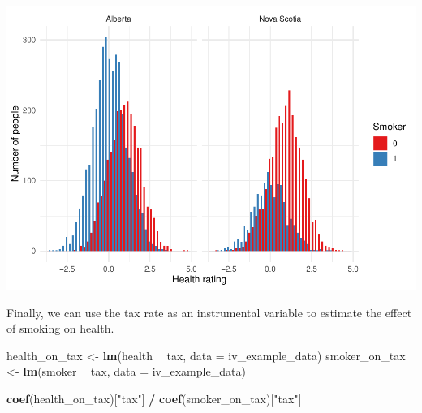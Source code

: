 \documentclass[
]{book}
\newenvironment{Shaded}{\begin{snugshade}}{\end{snugshade}}
\newcommand{\DataTypeTok}[1]{\textcolor[rgb]{0.13,0.29,0.53}{#1}}
\newcommand{\FloatTok}[1]{\textcolor[rgb]{0.00,0.00,0.81}{#1}}
\newcommand{\KeywordTok}[1]{\textcolor[rgb]{0.13,0.29,0.53}{\textbf{#1}}}
\newcommand{\NormalTok}[1]{#1}
\newcommand{\OperatorTok}[1]{\textcolor[rgb]{0.81,0.36,0.00}{\textbf{#1}}}
\newcommand{\StringTok}[1]{\textcolor[rgb]{0.31,0.60,0.02}{#1}}
\begin{document}
\begin{Shaded}
\end{Shaded}

\includegraphics{telling_stories_with_data_files/figure-latex/unnamed-chunk-388-1.pdf}

Finally, we can use the tax rate as an instrumental variable to estimate the effect of smoking on health.

\begin{Shaded}
\begin{Highlighting}[]
\NormalTok{health_on_tax <-}\StringTok{ }\KeywordTok{lm}\NormalTok{(health }\OperatorTok{~}\StringTok{ }\NormalTok{tax, }\DataTypeTok{data =}\NormalTok{ iv_example_data)}
\NormalTok{smoker_on_tax <-}\StringTok{ }\KeywordTok{lm}\NormalTok{(smoker }\OperatorTok{~}\StringTok{ }\NormalTok{tax, }\DataTypeTok{data =}\NormalTok{ iv_example_data)}

\KeywordTok{coef}\NormalTok{(health_on_tax)[}\StringTok{"tax"}\NormalTok{] }\OperatorTok{/}\StringTok{ }\KeywordTok{coef}\NormalTok{(smoker_on_tax)[}\StringTok{"tax"}\NormalTok{]}
\end{Highlighting}
\end{Shaded}
\end{document}
